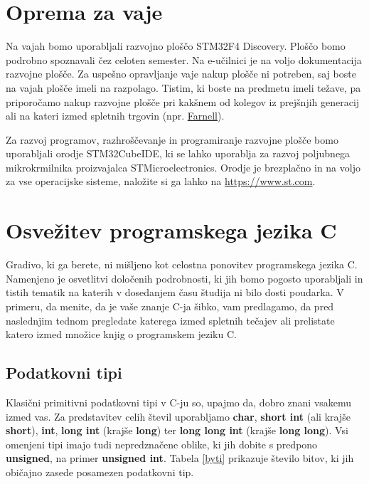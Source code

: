 \documentclass[12pt,letterpaper]{article}
\begin{document}
\section*{Oprema za vaje}

Na vajah bomo uporabljali razvojno ploščo STM32F4 Discovery. Ploščo bomo podrobno spoznavali čez celoten semester. Na e-učilnici je na voljo dokumentacija razvojne plošče. Za uspešno opravljanje vaje nakup plošče ni potreben, saj boste na vajah plošče imeli na razpolago. Tistim, ki boste na predmetu imeli težave, pa priporočamo nakup razvojne plošče pri kakšnem od kolegov iz prejšnjih generacij ali na kateri izmed spletnih trgovin (npr. \href{https://si.farnell.com/stmicroelectronics/stm32f407g-disc1/dev-board-foundation-line-mcu/dp/2506840?st=stm32f407}{Farnell}).

Za razvoj programov, razhroščevanje in programiranje razvojne plošče bomo uporabljali orodje STM32CubeIDE, ki se lahko uporablja za razvoj poljubnega mikrokrmilnika proizvajalca STMicroelectronics. Orodje je brezplačno in na voljo za vse operacijske sisteme, naložite si ga lahko na \href{https://www.st.com/en/development-tools/stm32cubeide.html}{https://www.st.com}.


\section*{Osvežitev programskega jezika C}

Gradivo, ki ga berete, ni mišljeno kot celostna ponovitev programskega jezika C. Namenjeno je osvetlitvi določenih podrobnosti, ki jih bomo pogosto uporabljali in tistih tematik na katerih v dosedanjem času študija ni bilo dosti poudarka. V primeru, da menite, da je vaše znanje C-ja šibko, vam predlagamo, da pred naslednjim tednom pregledate katerega izmed spletnih tečajev ali prelistate katero izmed množice knjig o programskem jeziku C.


\subsection*{Podatkovni tipi}

Klasični primitivni podatkovni tipi v C-ju so, upajmo da, dobro znani vsakemu izmed vas. Za predstavitev celih števil uporabljamo \textbf{char}, \textbf{short int} (ali krajše \textbf{short}), \textbf{int}, \textbf{long int} (krajše \textbf{long}) ter \textbf{long long int} (krajše \textbf{long long}). Vsi omenjeni tipi imajo tudi nepredznačene oblike, ki jih dobite s predpono \textbf{unsigned}, na primer \textbf{unsigned int}. Tabela \ref{byti} prikazuje število bitov, ki jih običajno zasede posamezen podatkovni tip.
\end{document}
